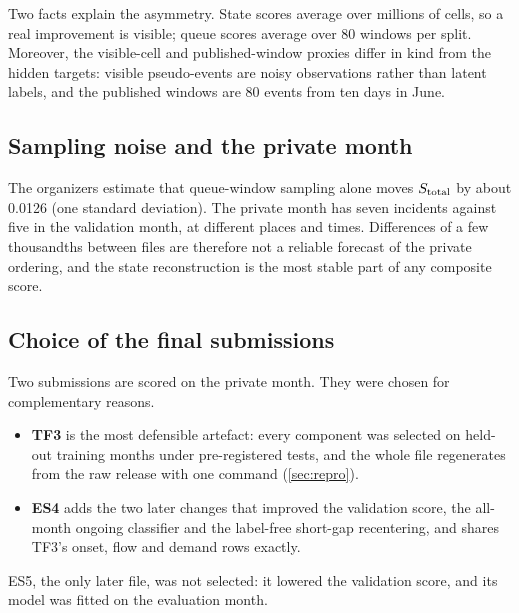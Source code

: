 Two facts explain the asymmetry. State scores average over millions of cells, so a real improvement is visible; queue
scores average over 80 windows per split. Moreover, the visible-cell and published-window proxies differ in kind from
the hidden targets: visible pseudo-events are noisy observations rather than latent labels, and the published windows
are 80 events from ten days in June.

\subsection{Sampling noise and the private month}
The organizers estimate that queue-window sampling alone moves $S_{\mathrm{total}}$ by about 0.0126 (one standard deviation).
The private month has seven incidents against five in the validation month, at different places and times.
Differences of a few thousandths between files are therefore not a reliable forecast of the private ordering, and the
state reconstruction is the most stable part of any composite score.

\subsection{Choice of the final submissions}
Two submissions are scored on the private month. They were chosen for complementary reasons.
\begin{itemize}
  \item \textbf{TF3} is the most defensible artefact: every component was selected on held-out training months under
        pre-registered tests, and the whole file regenerates from the raw release with one command (\cref{sec:repro}).
  \item \textbf{ES4} adds the two later changes that improved the validation score, the all-month ongoing classifier
        and the label-free short-gap recentering, and shares TF3's onset, flow and demand rows exactly.
\end{itemize}
ES5, the only later file, was not selected: it lowered the validation score, and its model was fitted on the
evaluation month.
